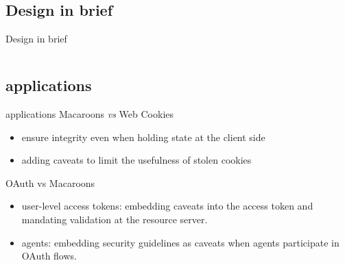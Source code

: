 \documentclass[9pt]{beamer}
\begin{document}
\subsection{Design in brief}
\begin{frame}{Design in brief}
  \begin{columns}
    \pause
  \end{columns}
\end{frame}

\subsection{applications}
\begin{frame}{applications}
  Macaroons \textit{vs} Web Cookies
  \begin{itemize}
    \pause
  \item ensure integrity even when holding state at the client side
    \pause
  \item adding caveats to limit the usefulness of stolen cookies
  \end{itemize}

  \pause
  OAuth vs Macaroons
  \begin{itemize}
    \pause
  \item user-level access tokens: embedding caveats into the access token and mandating validation at the resource server.
    \pause
  \item agents: embedding security guidelines as caveats when agents participate in OAuth flows.
  \end{itemize}
\end{frame}
\end{document}
